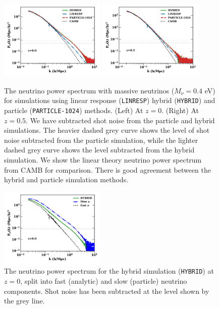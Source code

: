 \documentclass[useAMS, usenatbib]{mnras}
\begin{document}
\begin{figure}
\includegraphics[width=0.45\textwidth]{nuplots/pks-nu-1.pdf}
\includegraphics[width=0.45\textwidth]{nuplots/pks-nu-0_6667.pdf}
  \caption{The neutrino power spectrum with massive neutrinos ($M_\nu = 0.4$ eV) for simulations using linear response (\texttt{LINRESP}) hybrid (\texttt{HYBRID}) and particle (\texttt{PARTICLE-1024}) methods. (Left) At $z=0$. (Right) At $z=0.5$. We have subtracted shot noise from the particle and hybrid simulations. The heavier dashed grey curve shows the level of shot noise subtracted from the particle simulation, while the lighter dashed grey curve shows the level subtracted from the hybrid simulation. We show the linear theory neutrino power spectrum from CAMB for comparison. There is good agreement between the hybrid and particle simulation methods.}
  \label{fig:neutrino_power}
\end{figure}

\begin{figure}
\includegraphics[width=0.45\textwidth]{nuplots/pks-nu-split-1.pdf}
  \caption{The neutrino power spectrum for the hybrid simulation (\texttt{HYBRID}) at $z=0$, split into fast (analytic) and slow (particle) neutrino components. Shot noise has been subtracted at the level shown by the grey line.}
  \label{fig:neutrino_power_split}
\end{figure}
\end{document}
